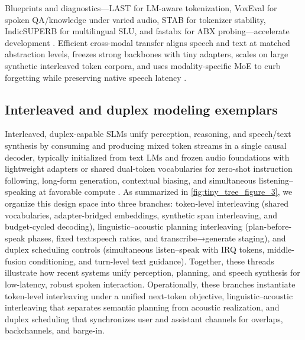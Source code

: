 \documentclass{article}
\begin{document}
Blueprints and diagnostics—LAST for LM-aware tokenization, VoxEval for spoken QA/knowledge under varied audio, STAB for tokenizer stability, IndicSUPERB for multilingual SLU, and fastabx for ABX probing—accelerate development \cite{turetzky2024lastlanguagemodelawarespeechtokenization,cui2025voxevalbenchmarkingknowledgeunderstandin,vashishth2024stabspeechtokenizerassessmentbenchmark,entry2025indicsuperbspeechprocessinguniversalperf,poli2025fastabxlibraryefficientcomputationabxdis}. Efficient cross-modal transfer aligns speech and text at matched abstraction levels, freezes strong backbones with tiny adapters, scales on large synthetic interleaved token corpora, and uses modality-specific MoE to curb forgetting while preserving native speech latency \cite{cuervo2025textspeechlanguagemodelsimprovedcrossmod,shao2025deeptalktowardsseamlesssmartspeechintera,wang2023slmbridgethingapbetweenspeechtextfoundat,zeng2024scalingspeechtextpretrainingsyntheticint,entry2025towardjointlanguagemodelingspeechunitste}.

\subsection{Interleaved and duplex modeling exemplars} \label{subsec:Interleaved and duplex modeling exemplars}
Interleaved, duplex-capable SLMs unify perception, reasoning, and speech/text synthesis by consuming and producing mixed token streams in a single causal decoder, typically initialized from text LMs and frozen audio foundations with lightweight adapters or shared dual-token vocabularies for zero-shot instruction following, long-form generation, contextual biasing, and simultaneous listening–speaking at favorable compute \cite{maimon2025scalinganalysisinterleavedspeechtextlang,park2025longformspeechgenerationspokenlanguagemo,wang2023slmbridgethingapbetweenspeechtextfoundat,wang2025dualspeechlmtowardsunifiedspeechundersta,entry2025towardjointlanguagemodelingspeechunitste}. As summarized in \autoref{fig:tiny_tree_figure_3}, we organize this design space into three branches: token-level interleaving (shared vocabularies, adapter-bridged embeddings, synthetic span interleaving, and budget-cycled decoding), linguistic–acoustic planning interleaving (plan-before-speak phases, fixed text:speech ratios, and transcribe→generate staging), and duplex scheduling controls (simultaneous listen–speak with IRQ tokens, middle-fusion conditioning, and turn-level text guidance). Together, these threads illustrate how recent systems unify perception, planning, and speech synthesis for low-latency, robust spoken interaction. Operationally, these branches instantiate token-level interleaving under a unified next-token objective, linguistic–acoustic interleaving that separates semantic planning from acoustic realization, and duplex scheduling that synchronizes user and assistant channels for overlaps, backchannels, and barge-in.
\end{document}
